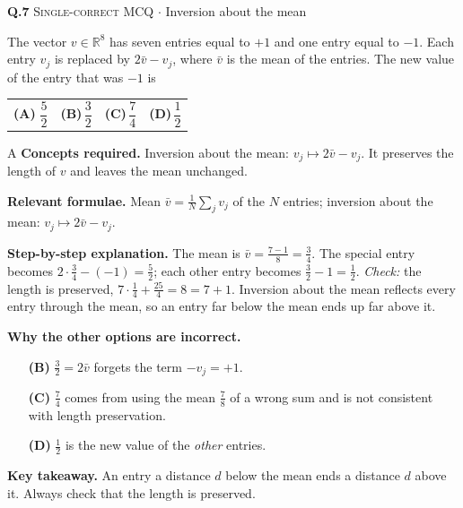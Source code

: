 \documentclass[11pt,a4paper]{article}
\newcommand{\optlabel}[1]{\textbf{(#1)}}
\newcommand{\correctlabel}[1]{\textcolor{okgreen}{\textbf{(#1)}\,\ding{51}}}
\newenvironment{qitem}[1]{\begin{list}{}{\setlength{\leftmargin}{3.3em}\setlength{\labelwidth}{3.1em}%
  \setlength{\labelsep}{0.2em}\setlength{\topsep}{3pt}\setlength{\parsep}{3pt}}\item[\textbf{Q.#1}\hfill]}{\end{list}}
\newcommand{\qsep}{\par\vspace{2pt}{\color{black!15}\hrule}\vspace{4pt}}
\newcommand{\qmeta}[2]{{\footnotesize\color{black!60}\textsc{#1} \;$\cdot$\; #2}\par}
\begin{document}
\begin{qitem}{7}
\qmeta{Single-correct MCQ}{Inversion about the mean}
The vector $v \in \mathbb{R}^{8}$ has seven entries equal to $+1$ and one entry equal to $-1$. Each entry $v_j$ is replaced by $2\bar v - v_j$,
where $\bar v$ is the mean of the entries. The new value of the entry that was $-1$ is
\par\smallskip\noindent\begin{tabularx}{\linewidth}{@{}*{4}{L}@{}}
\correctlabel{A}\,$\dfrac52$ & \optlabel{B}\,$\dfrac32$ & \optlabel{C}\,$\dfrac74$ & \optlabel{D}\,$\dfrac12$
\end{tabularx}
\end{qitem}
\begin{solbox}{A}
\textbf{\color{brand}Concepts required.} Inversion about the mean: $v_j \mapsto 2\bar v - v_j$. It preserves the length of $v$ and leaves the mean unchanged.

\textbf{\color{brand}Relevant formulae.} Mean $\bar v = \frac1N\sum_jv_j$ of the $N$ entries; inversion about the mean: $v_j \mapsto 2\bar v - v_j$.

\textbf{\color{brand}Step-by-step explanation.} The mean is $\bar v = \frac{7 - 1}{8} = \frac34$. The special entry becomes $2\cdot\frac34 - (-1) = \frac52$; each other entry becomes
$\frac32 - 1 = \frac12$. \emph{Check:} the length is preserved, $7\cdot\frac14 + \frac{25}{4} = 8 = 7 + 1$.
Inversion about the mean reflects every entry through the mean, so an entry far below the mean ends up far above it.

\textbf{\color{brand}Why the other options are incorrect.}
\begin{itemize}[leftmargin=2.4em, itemsep=1pt, topsep=2pt]
\item[\textbf{(B)}] $\frac32 = 2\bar v$ forgets the term $-v_j = +1$.
\item[\textbf{(C)}] $\frac74$ comes from using the mean $\frac78$ of a wrong sum and is not consistent with length preservation.
\item[\textbf{(D)}] $\frac12$ is the new value of the \emph{other} entries.
\end{itemize}
\textbf{\color{brand}Key takeaway.} An entry a distance $d$ below the mean ends a distance $d$ above it. Always check that the length is preserved.
\end{solbox}
\qsep
\end{document}
